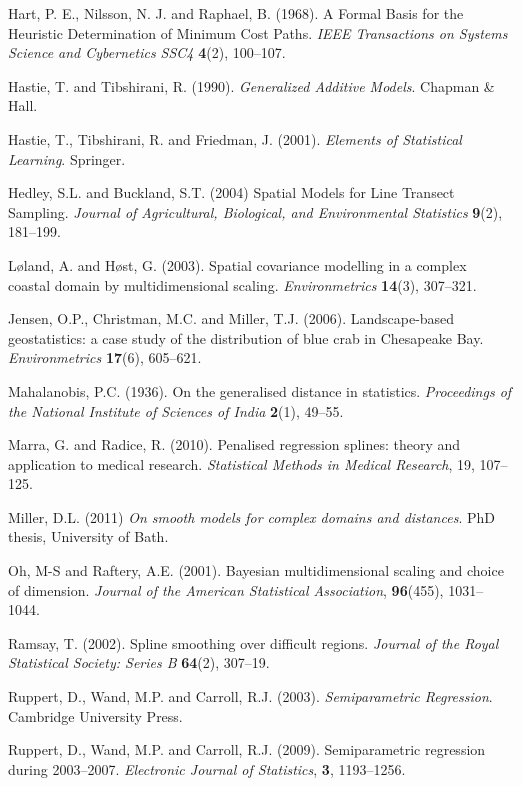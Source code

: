 \documentclass[useAMS, referee]{biom}
\begin{document}
\begin{thebibliography}{99}
\bibitem{} Hart, P. E., Nilsson, N. J. and Raphael, B. (1968). A Formal Basis for the Heuristic Determination of Minimum Cost Paths. \textit{IEEE Transactions on Systems Science and Cybernetics SSC4} \textbf{4}(2), 100--107.

\bibitem{} Hastie, T. and Tibshirani, R. (1990). \textit{Generalized Additive Models}. Chapman \& Hall.

\bibitem{} Hastie, T., Tibshirani, R. and Friedman, J. (2001). \textit{Elements of Statistical Learning}. Springer.

\bibitem{ } Hedley, S.L. and Buckland, S.T. (2004) Spatial Models for Line Transect Sampling. \textit{Journal of Agricultural, Biological, and Environmental Statistics} \textbf{9}(2), 181--199.

\bibitem{} L{\o}land, A. and H{\o}st, G. (2003). Spatial covariance modelling in a complex coastal domain by multidimensional scaling. \textit{Environmetrics} \textbf{14}(3), 307--321.

\bibitem{} Jensen, O.P., Christman, M.C. and Miller, T.J. (2006). Landscape-based geostatistics: a case study of the distribution of blue crab in {C}hesapeake {B}ay. \textit{Environmetrics} \textbf{17}(6), 605--621.

\bibitem{} Mahalanobis, P.C. (1936). On the generalised distance in statistics. \textit{Proceedings of the National Institute of Sciences of India} \textbf{2}(1), 49--55.

\bibitem{} Marra, G. and Radice, R. (2010). Penalised regression splines: theory and application to medical research. \textit{Statistical Methods in Medical Research}, 19, 107--125.

\bibitem{} Miller, D.L. (2011) \textit{On smooth models for complex domains and distances}. PhD thesis, University of Bath.

\bibitem{} Oh, M-S and Raftery, A.E. (2001). Bayesian multidimensional scaling and choice of dimension. \textit{Journal of the American Statistical Association}, \textbf{96}(455), 1031--1044.

\bibitem{} Ramsay, T. (2002). Spline smoothing over difficult regions. \textit{Journal of the Royal Statistical Society: Series B} \textbf{64}(2), 307--19.

\bibitem{} Ruppert, D., Wand, M.P. and Carroll, R.J. (2003). \textit{Semiparametric Regression}. Cambridge University Press.

\bibitem{} Ruppert, D., Wand, M.P. and Carroll, R.J. (2009). Semiparametric regression during 2003--2007. \textit{Electronic Journal of Statistics}, \textbf{3}, 1193--1256.


\end{thebibliography}
\end{document}
